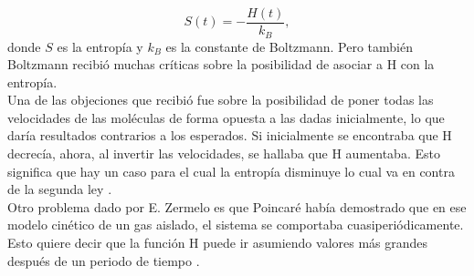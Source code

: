 \begin{equation}
S(t)=- \frac{H(t)}{k_{B}},
\end{equation}
donde $S$ es la entropía y $k_{B}$ es la constante de Boltzmann. Pero también Boltzmann recibió muchas críticas sobre  la posibilidad de asociar a H con la entropía.
\\
Una de las objeciones que recibió fue sobre la posibilidad de poner todas las velocidades de las moléculas de forma opuesta a las dadas inicialmente, lo que daría resultados contrarios a los esperados. Si inicialmente se encontraba que H decrecía, ahora, al invertir las velocidades, se hallaba que H aumentaba. Esto significa que hay un caso para el cual la entropía disminuye lo cual va en contra de la segunda ley \cite{KhinchinStat}. 
\\
Otro problema dado por E. Zermelo es que Poincaré había demostrado que en ese modelo cinético de un gas aislado, el sistema se comportaba cuasiperiódicamente. Esto quiere decir que la función H puede ir asumiendo valores más grandes después de un periodo de tiempo \cite{Ehrenfest}. 
\\

